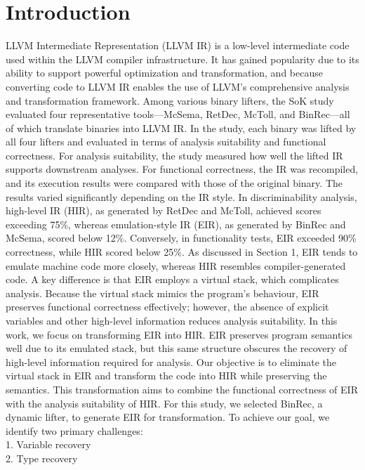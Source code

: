 \section{Introduction}
LLVM Intermediate Representation (LLVM IR) is a low-level intermediate code
used within the LLVM compiler infrastructure. It has gained popularity due to
its ability to support powerful optimization and transformation, and because
converting code to LLVM IR enables the use of LLVM’s comprehensive analysis and
transformation framework.
Among various binary lifters, the SoK study evaluated four representative
tools—McSema, RetDec, McToll, and BinRec—all of which translate binaries into
LLVM IR. In the study, each binary was lifted by all four lifters and evaluated
in terms of analysis suitability and functional correctness. For analysis
suitability, the study measured how well the lifted IR supports downstream
analyses. For functional correctness, the IR was recompiled, and its execution
results were compared with those of the original binary.
The results varied significantly depending on the IR style. In discriminability
analysis, high-level IR (HIR), as generated by RetDec and McToll, achieved
scores exceeding 75\%, whereas emulation-style IR (EIR), as generated by BinRec
and McSema, scored below 12\%. Conversely, in functionality tests, EIR exceeded
90\% correctness, while HIR scored below 25\%. As discussed in Section 1, EIR
tends to emulate machine code more closely, whereas HIR resembles
compiler-generated code. A key difference is that EIR employs a virtual stack,
which complicates analysis. Because the virtual stack mimics the program’s
behaviour, EIR preserves functional correctness effectively; however, the
absence of explicit variables and other high-level information reduces analysis
suitability.
In this work, we focus on transforming EIR into HIR. EIR preserves program
semantics well due to its emulated stack, but this same structure obscures the
recovery of high-level information required for analysis. Our objective is to
eliminate the virtual stack in EIR and transform the code into HIR while
preserving the semantics. This transformation aims to combine the functional
correctness of EIR with the analysis suitability of HIR.
For this study, we selected BinRec, a dynamic lifter, to generate EIR for
transformation. To achieve our goal, we identify two primary challenges:\\
1. Variable recovery \\
2. Type recovery \\

